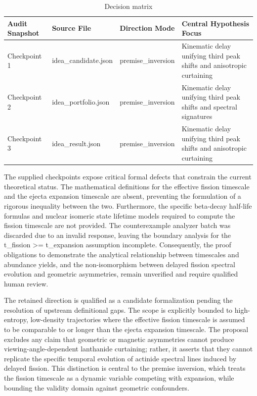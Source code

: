 \documentclass[conference]{IEEEtran}
\begin{document}
\begin{table}[htbp]
\centering
\footnotesize
\setlength{\tabcolsep}{3pt}
\renewcommand{\arraystretch}{1.12}
\caption{Decision matrix}
\label{tab:idea-origin-and-selection-checkpoint-table}
\begin{tabular}{|p{}|p{}|p{}|p{}|}
\hline
Audit Snapshot & Source File & Direction Mode & Central Hypothesis Focus \\\hline
Checkpoint 1 & idea\_candidate.json & premise\_inversion & Kinematic delay unifying third peak shifts and anisotropic curtaining \\\hline
Checkpoint 2 & idea\_portfolio.json & premise\_inversion & Kinematic delay unifying third peak shifts and spectral signatures \\\hline
Checkpoint 3 & idea\_result.json & premise\_inversion & Kinematic delay unifying third peak shifts and anisotropic curtaining \\\hline
\end{tabular}
\end{table}

The supplied checkpoints expose critical formal defects that constrain the current theoretical status. The mathematical definitions for the effective fission timescale and the ejecta expansion timescale are absent, preventing the formulation of a rigorous inequality between the two. Furthermore, the specific beta-decay half-life formulas and nuclear isomeric state lifetime models required to compute the fission timescale are not provided. The counterexample analyzer batch was discarded due to an invalid response, leaving the boundary analysis for the t\_fission >= t\_expansion assumption incomplete. Consequently, the proof obligations to demonstrate the analytical relationship between timescales and abundance yields, and the non-isomorphism between delayed fission spectral evolution and geometric asymmetries, remain unverified and require qualified human review.

The retained direction is qualified as a candidate formalization pending the resolution of upstream definitional gaps. The scope is explicitly bounded to high-entropy, low-density trajectories where the effective fission timescale is assumed to be comparable to or longer than the ejecta expansion timescale. The proposal excludes any claim that geometric or magnetic asymmetries cannot produce viewing-angle-dependent lanthanide curtaining; rather, it asserts that they cannot replicate the specific temporal evolution of actinide spectral lines induced by delayed fission. This distinction is central to the premise inversion, which treats the fission timescale as a dynamic variable competing with expansion, while bounding the validity domain against geometric confounders.
\end{document}
